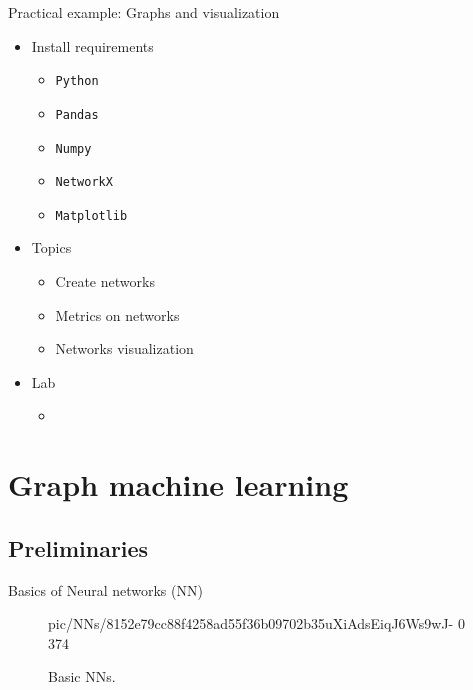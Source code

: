 \documentclass{beamer}
\begin{document}
    \begin{frame}{Practical example: Graphs and visualization}
        \begin{itemize}
            \item Install requirements
                \begin{itemize}
                    \item \texttt{Python}
                    \item \texttt{Pandas}
                    \item \texttt{Numpy}
                    \item \texttt{NetworkX}
                    \item \texttt{Matplotlib}
                \end{itemize}
            \item Topics 
                \begin{itemize}
                    \item Create networks
                    \item Metrics on networks
                    \item Networks visualization
                \end{itemize}
            \item Lab
                \begin{itemize}
                    \item              
                        \href{https://drive.google.com/file/d/199QkU5jbJrrg4URuxGU8wGuvIF91y1mo/view?usp=sharing}{
                        }
                \end{itemize}
        \end{itemize}
    \end{frame}

\section{Graph machine learning}
    \subsection{Preliminaries}
        \begin{frame}{Basics of Neural networks (NN)}
            \begin{figure}
                \centering
                {pic/NNs/8152e79cc88f4258ad55f36b09702b35uXiAdsEiqJ6Ws9wJ-} %
                {0} %
                {374} %
                \caption{Basic NNs.}%
            \end{figure}
        \end{frame}
\end{document}
